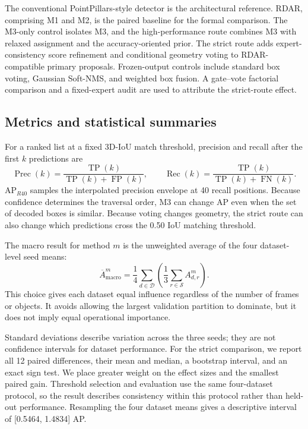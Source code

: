 \documentclass[sensors,article,submit,pdftex,moreauthors]{Definitions/mdpi}
\begin{document}
The conventional PointPillars-style detector is the architectural reference.
RDAR, comprising M1 and M2, is the paired baseline for the formal comparison.
The M3-only control isolates M3, and the high-performance route combines
M3 with relaxed assignment and the accuracy-oriented prior. The strict route
adds expert-consistency score refinement and conditional geometry voting to
RDAR-compatible primary proposals. Frozen-output controls include standard box
voting, Gaussian Soft-NMS, and weighted box fusion. A gate--vote factorial
comparison and a fixed-expert audit are used to attribute the strict-route
effect.

\subsection{Metrics and statistical summaries}

For a ranked list at a fixed 3D-IoU match threshold, precision and recall after
the first $k$ predictions are
\begin{equation}
\operatorname{Prec}(k)=\frac{\operatorname{TP}(k)}
{\operatorname{TP}(k)+\operatorname{FP}(k)},\qquad
\operatorname{Rec}(k)=\frac{\operatorname{TP}(k)}
{\operatorname{TP}(k)+\operatorname{FN}(k)}.
\end{equation}
AP$_{R40}$ samples the interpolated precision envelope at 40 recall positions.
Because confidence determines the traversal order, M3 can change AP even when
the set of decoded boxes is similar. Because voting changes geometry, the
strict route can also change which predictions cross the 0.50 IoU matching
threshold.

The macro result for method $m$ is the unweighted average of the four
dataset-level seed means:
\begin{equation}
\overline A_{\mathrm{macro}}^m =
\frac{1}{4}\sum_{d\in\mathcal{D}}
\left(\frac{1}{3}\sum_{r\in\mathcal{S}} A_{d,r}^m\right).
\end{equation}
This choice gives each dataset equal influence regardless of the number of
frames or objects. It avoids allowing the largest validation partition to
dominate, but it does not imply equal operational importance.

Standard deviations describe variation across the three seeds; they are not
confidence intervals for dataset performance. For the strict comparison, we
report all 12 paired differences, their mean and median, a bootstrap interval,
and an exact sign test. We place greater weight on the effect sizes and the
smallest paired gain. Threshold selection and evaluation use the same
four-dataset protocol, so the result describes consistency within this
protocol rather than held-out performance. Resampling the four dataset means
gives a descriptive interval of [0.5464, 1.4834] AP.
\end{document}

